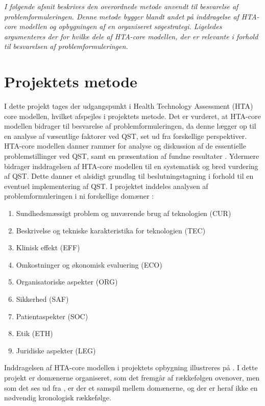 \textit{I følgende afsnit beskrives den overordnede metode anvendt til besvarelse af problemformuleringen. Denne metode bygger blandt andet på inddragelse af HTA-core modellen og opbygningen af en organiseret søgestrategi. Ligeledes argumenteres der for hvilke dele af HTA-core modellen, der er relevante i forhold til besvarelsen af problemformuleringen.}

\section{Projektets metode}
I dette projekt tages der udgangspunkt i Health Technology Assessment (HTA) core modellen, hvilket afspejles i projektets metode. Det er vurderet, at HTA-core modellen bidrager til besvarelse af problemformuleringen, da denne lægger op til en analyse af væsentlige faktorer ved QST, set ud fra forskellige perspektiver. HTA-core modellen danner rammer for analyse og diskussion af de essentielle problemstillinger ved QST, samt en præsentation af fundne resultater \citep{HTAcore}. Ydermere bidrager inddragelsen af HTA-core modellen til en systematisk og bred vurdering af QST. Dette danner et alsidigt grundlag til beslutningstagning i forhold til en eventuel implementering af QST. \citep{HTAcore} \citep{metodehaandbogen} I projektet inddeles analysen af problemformuleringen i ni forskellige domæner \citep{HTAcore}:

\begin{enumerate}
\item Sundhedsmæssigt problem og nuværende brug af teknologien (CUR)
\item Beskrivelse og tekniske karakteristika for teknologien (TEC)
\item Klinisk effekt (EFF)
\item Omkostninger og økonomisk evaluering (ECO)
\item Organisatoriske aspekter (ORG)
\item Sikkerhed (SAF)
\item Patientaspekter (SOC)
\item Etik (ETH)
\item Juridiske aspekter (LEG)
\end{enumerate}

Inddragelsen af HTA-core modellen i projektets opbygning illustreres på . I dette projekt er domænerne organiseret, som det fremgår af rækkefølgen ovenover, men som det ses ud fra , er der et samspil mellem domænerne, og der er heraf ikke en nødvendig kronologisk rækkefølge.

